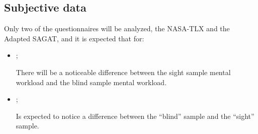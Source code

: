 \subsection{Subjective data}

Only two of the questionnaires will be analyzed, the NASA-TLX and the Adapted SAGAT, and it is expected that for:

\begin{itemize}
    \item {};
    
        There will be a noticeable difference between the sight sample mental workload and the blind sample mental workload.

    \item {};
    
        Is expected to notice a difference between the “blind” sample and the “sight” sample.

\end{itemize}





